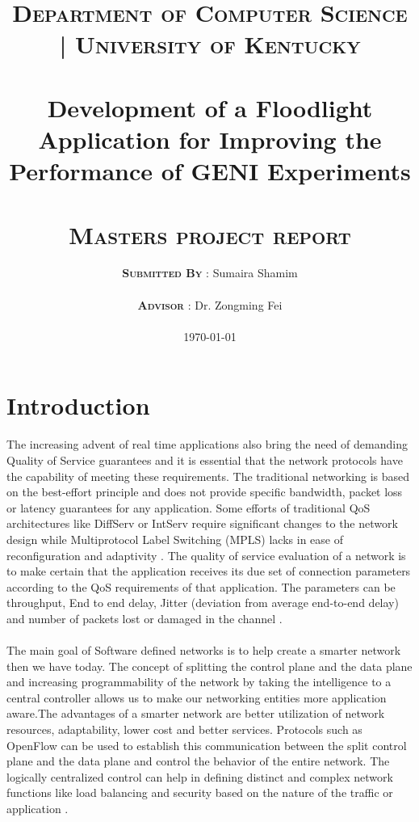 \documentclass[paper=a4, fontsize=12pt]{scrartcl}	%
\title{
		\usefont{OT1}{bch}{b}{n}
		\normalfont \normalsize \textsc{\textbf{Department of Computer Science | University of Kentucky}} \\ [28pt]
		\horrule{0.5pt} \\[0.4cm]
		\huge Development of a Floodlight Application for Improving the Performance of GENI Experiments\\
		\horrule{2pt} \\[0.5cm]
		\normalfont \normalsize \textsc{\textbf{Masters project report}}
}
\author{
		\normalfont \normalsize \textsc{\textbf{Submitted By}} 
		\normalfont 								\normalsize
       	{: Sumaira Shamim}\\[-3pt]		\normalsize \\
       	\normalfont \normalsize \textsc{\textbf{Advisor}} 
       	\normalfont 								\normalsize
       	{: Dr. Zongming Fei}\\[-3pt]		\normalsize \\
  \today      
}
\date{}
\numberwithin{equation}{section}		%
\numberwithin{figure}{section}			%
\numberwithin{table}{section}				%
\begin{document}
\maketitle
\thispagestyle{empty}

\newpage
\setcounter{page}{1}
\tableofcontents
\newpage

\section{Introduction}
The increasing advent of real time applications also bring the need of demanding Quality of Service guarantees and it is essential that the network protocols have the capability of meeting these requirements. The traditional networking is based on the best-effort principle and does not provide specific bandwidth, packet loss or latency guarantees for any application. Some efforts of traditional QoS architectures like DiffServ or IntServ require significant changes to the network design while Multiprotocol Label Switching (MPLS) lacks in ease of reconfiguration and adaptivity \cite{thesis}. The quality of service evaluation of a network is to make certain that the application receives its due set of connection parameters according to the QoS requirements of that application. The parameters can be throughput, End to end delay, Jitter (deviation from average end-to-end delay) and number of packets lost or damaged in the channel \cite{multipath}. 
\\
\\
The main goal of Software defined networks is to help create a smarter network then we have today. The concept of splitting the control plane and the data plane and increasing programmability of the network by taking the intelligence to a central controller allows us to make our networking entities more application aware.The advantages of a smarter network are better utilization of network resources, adaptability, lower cost and better services. Protocols such as OpenFlow can be used to establish this communication between the split control plane and the data plane and control the behavior of the entire network. The logically centralized control can help in defining distinct and complex network functions like load balancing and security based on the nature of the traffic or application \cite{thesis}. 
\\
\end{document}
